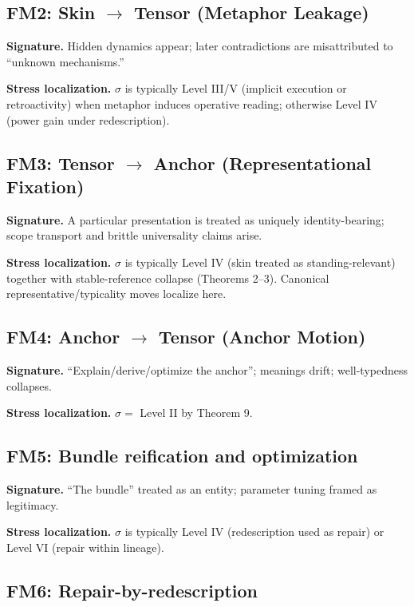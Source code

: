 \documentclass[12pt]{article}
\theoremstyle{plain}
\begin{document}
\subsection{FM2: Skin \texorpdfstring{$\rightarrow$}{->} Tensor (Metaphor Leakage)}

\textbf{Signature.} Hidden dynamics appear; later contradictions are misattributed to ``unknown mechanisms.''

\textbf{Stress localization.} $\sigma$ is typically Level III/V (implicit execution or retroactivity) when metaphor induces operative reading; otherwise Level IV (power gain under redescription).

\subsection{FM3: Tensor \texorpdfstring{$\rightarrow$}{->} Anchor (Representational Fixation)}

\textbf{Signature.} A particular presentation is treated as uniquely identity-bearing; scope transport and brittle universality claims arise.

\textbf{Stress localization.} $\sigma$ is typically Level IV (skin treated as standing-relevant) together with stable-reference collapse (Theorems 2--3). Canonical representative/typicality moves localize here.

\subsection{FM4: Anchor \texorpdfstring{$\rightarrow$}{->} Tensor (Anchor Motion)}

\textbf{Signature.} ``Explain/derive/optimize the anchor''; meanings drift; well-typedness collapses.

\textbf{Stress localization.} $\sigma = $ Level II by Theorem 9.

\subsection{FM5: Bundle reification and optimization}

\textbf{Signature.} ``The bundle'' treated as an entity; parameter tuning framed as legitimacy.

\textbf{Stress localization.} $\sigma$ is typically Level IV (redescription used as repair) or Level VI (repair within lineage).

\subsection{FM6: Repair-by-redescription}
\end{document}
